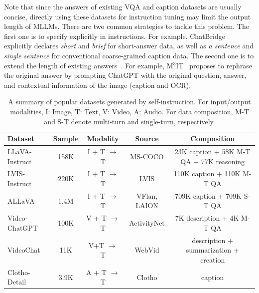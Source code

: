 Note that since the answers of existing VQA and caption datasets are usually concise, directly using these datasets for instruction tuning may limit the output length of MLLMs. There are two common strategies to tackle this problem. 
The first one is to specify explicitly in instructions. 
For example, ChatBridge~\cite{chatbridge} explicitly declares \textit{short} and \textit{brief} for short-answer data, as well as \textit{a sentence} and \textit{single sentence} for conventional coarse-grained caption data.
The second one is to extend the length of existing answers~\cite{m3it}.
For example, M$^3$IT~\cite{m3it} proposes to rephrase the original answer by prompting ChatGPT with the original question, answer, and contextual information of the image (\eg caption and OCR).



\begin{table}[!htb]
\centering
\caption{A summary of popular datasets generated by self-instruction. For input/output modalities, I: Image, T: Text, V: Video, A: Audio. For data composition, M-T and S-T denote multi-turn and single-turn, respectively.}
\label{tab:IT-data}
\begin{tabular}{lcccc}
\toprule
\textbf{Dataset} & \textbf{Sample} & \textbf{Modality}     & \textbf{Source} & \textbf{Composition}                     \\
\midrule
LLaVA-Instruct   & 158K              & I + T $\rightarrow$ T & MS-COCO         & 23K caption + 58K M-T QA + 77K reasoning \\
LVIS-Instruct & 220K & I + T $\rightarrow$ T & LVIS         & 110K caption + 110K M-T QA             \\
ALLaVA        & 1.4M & I + T $\rightarrow$ T & VFlan, LAION & 709K caption + 709K S-T QA             \\
\midrule
Video-ChatGPT & 100K & V + T $\rightarrow$ T & ActivityNet  & 7K description + 4K M-T QA             \\
VideoChat     & 11K  & V+T $\rightarrow$ T   & WebVid       & description + summarization + creation \\
\midrule
Clotho-Detail & 3.9K & A + T $\rightarrow$ T & Clotho       & caption                                \\
\bottomrule
\end{tabular}
\end{table}



